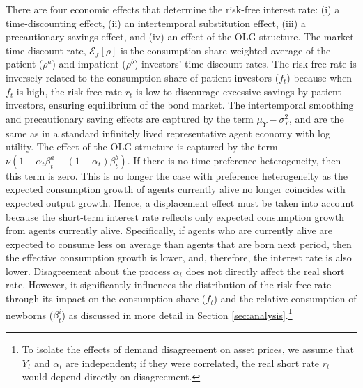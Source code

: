 \documentclass[preprint,11pt,authoryear]{elsarticle}
\theoremstyle{plain}
\begin{document}
There are four economic effects that determine the risk-free interest rate: (i) a time-discounting effect, (ii) an intertemporal substitution effect, (iii) a precautionary savings effect, and (iv) an effect of the OLG structure. The market time discount rate, $\mathcal{E}_{f}\left [ \rho \right]$ is the consumption share weighted average of the patient ($\rho^a$) and impatient ($\rho^b$) investors' time discount rates.  The risk-free rate is inversely related to the consumption share of patient investors ($f_t$) because when $f_t$ is high, the risk-free rate $r_t$ is low to discourage excessive savings by patient investors, ensuring equilibrium of the bond market. The intertemporal smoothing and precautionary saving effects are captured by the term $\mu_Y - \sigma_Y^2$, and are the same as in a standard infinitely lived representative agent economy with log utility. The effect of the OLG structure is captured by the term $ \nu\left(1 - \alpha_t \beta^a_t - \left(1-\alpha_t\right)\beta^b_t\right)$. If there is no time-preference heterogeneity, then this term is zero. This is no longer the case with preference heterogeneity as the expected consumption growth of agents currently alive no longer coincides with expected output growth. Hence, a displacement effect must be taken into account because the short-term interest rate reflects only expected consumption growth from agents currently alive. Specifically, if agents who are currently alive are expected to consume less on average than agents that are born next period, then the effective consumption growth is lower, and, therefore, the interest rate is also lower. Disagreement about the process $\alpha_t$ does not directly affect the real short rate. However, it significantly influences the distribution of the risk-free rate through its impact on the consumption share ($f_t$) and the relative consumption of newborns ($\beta^i_t$) as discussed in more detail in Section \ref{sec:analysis}.\footnote{To isolate the effects of demand disagreement on asset prices, we assume that $Y_t$ and $\alpha_t$ are independent; if they were correlated, the real short rate $r_t$ would depend directly on disagreement.}
\end{document}
